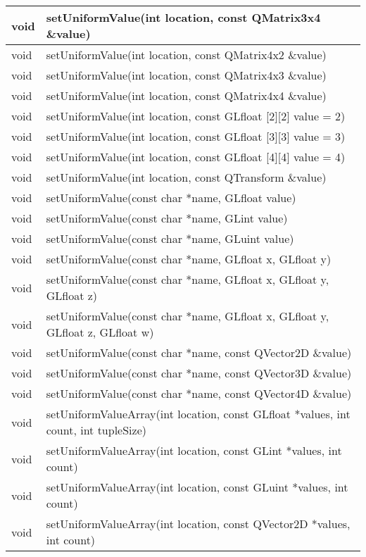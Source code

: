 \begin{longtable}[l]{|l|m{34em}|}
    \hline
    void	&setUniformValue(int location, const QMatrix3x4 \&value) \\ 
    \hline
    void	&setUniformValue(int location, const QMatrix4x2 \&value) \\ 
    \hline
    void	&setUniformValue(int location, const QMatrix4x3 \&value) \\
    \hline
    void	&setUniformValue(int location, const QMatrix4x4 \&value) \\ 
    \hline
    void	&setUniformValue(int location, const GLfloat [2][2] value = 2) \\ 
    \hline
    void	&setUniformValue(int location, const GLfloat [3][3] value = 3) \\ 
    \hline
    void	&setUniformValue(int location, const GLfloat [4][4] value = 4) \\ 
    \hline
    void	&setUniformValue(int location, const QTransform \&value) \\ 
    \hline
    void	&setUniformValue(const char *name, GLfloat value) \\ 
    \hline
    void	&setUniformValue(const char *name, GLint value) \\ 
    \hline
    void	&setUniformValue(const char *name, GLuint value) \\
    \hline
    void&	setUniformValue(const char *name, GLfloat x, GLfloat y) \\ 
    \hline
    void&	setUniformValue(const char *name, GLfloat x, GLfloat y, GLfloat z) \\ 
    \hline
    void	&setUniformValue(const char *name, GLfloat x, GLfloat y, GLfloat z, GLfloat w) \\ 
    \hline
    void	&setUniformValue(const char *name, const QVector2D \&value) \\
     \hline
    void	&setUniformValue(const char *name, const QVector3D \&value) \\ 
    \hline
    void	&setUniformValue(const char *name, const QVector4D \&value) \\ 
    \hline
    void	&setUniformValueArray(int location, const GLfloat *values, int count, int tupleSize) \\
    \hline
    void	&setUniformValueArray(int location, const GLint *values, int count) \\  
    \hline
    void	&setUniformValueArray(int location, const GLuint *values, int count) \\ 
    \hline
    void	&setUniformValueArray(int location, const QVector2D *values, int count) \\ 

\end{longtable}
